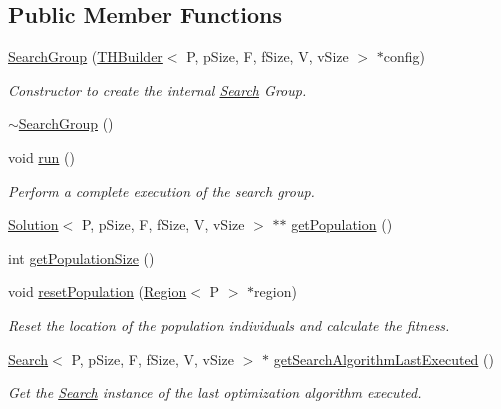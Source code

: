 \subsection*{Public Member Functions}
\begin{DoxyCompactItemize}
\item 
\hyperlink{classTHBuilder_1_1SearchGroup_a794cf5448380674b51022b5d65a240e2}{Search\+Group} (\hyperlink{classTHBuilder}{T\+H\+Builder}$<$ P, p\+Size, F, f\+Size, V, v\+Size $>$ $\ast$config)
\begin{DoxyCompactList}\small\item\em Constructor to create the internal \hyperlink{classSearch}{Search} Group. \end{DoxyCompactList}\item 
\hyperlink{classTHBuilder_1_1SearchGroup_abae61242c9f9ec5a031b9be2505aedd0}{$\sim$\+Search\+Group} ()
\item 
void \hyperlink{classTHBuilder_1_1SearchGroup_ac8c33d89ddd52e38fb23d7102d9086e0}{run} ()
\begin{DoxyCompactList}\small\item\em Perform a complete execution of the search group. \end{DoxyCompactList}\item 
\hyperlink{classSolution}{Solution}$<$ P, p\+Size, F, f\+Size, V, v\+Size $>$ $\ast$$\ast$ \hyperlink{classTHBuilder_1_1SearchGroup_ab65d8aba4bd99bb65d31a01fd649415e}{get\+Population} ()
\item 
int \hyperlink{classTHBuilder_1_1SearchGroup_a3f8d98c07db48420c49bee854c00ae8b}{get\+Population\+Size} ()
\item 
void \hyperlink{classTHBuilder_1_1SearchGroup_aafebb836a1ec681213319a024a254ca8}{reset\+Population} (\hyperlink{classRegion}{Region}$<$ P $>$ $\ast$region)
\begin{DoxyCompactList}\small\item\em Reset the location of the population individuals and calculate the fitness. \end{DoxyCompactList}\item 
\hyperlink{classSearch}{Search}$<$ P, p\+Size, F, f\+Size, V, v\+Size $>$ $\ast$ \hyperlink{classTHBuilder_1_1SearchGroup_a0dcdc7254955afc39899a52f9b997fc3}{get\+Search\+Algorithm\+Last\+Executed} ()
\begin{DoxyCompactList}\small\item\em Get the \hyperlink{classSearch}{Search} instance of the last optimization algorithm executed. \end{DoxyCompactList}\item 
$$
\end{DoxyCompactItemize}
